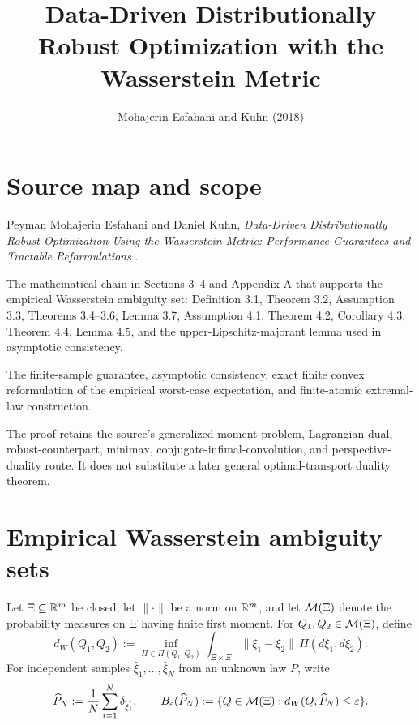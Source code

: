 
\title{Data-Driven Distributionally Robust Optimization with the Wasserstein Metric}
\author{}
\date{Mohajerin Esfahani and Kuhn (2018)}

\maketitle

\section*{Source map and scope}
\begin{sourceguide}
\item[Primary source] Peyman Mohajerin Esfahani and Daniel Kuhn, \emph{Data-Driven Distributionally Robust Optimization Using the Wasserstein Metric: Performance Guarantees and Tractable Reformulations} \cite{MohajerinEsfahaniKuhn2018}.
\item[Coverage] The mathematical chain in Sections 3--4 and Appendix A that supports the empirical Wasserstein ambiguity set: Definition 3.1, Theorem 3.2, Assumption 3.3, Theorems 3.4--3.6, Lemma 3.7, Assumption 4.1, Theorem 4.2, Corollary 4.3, Theorem 4.4, Lemma 4.5, and the upper-Lipschitz-majorant lemma used in asymptotic consistency.
\item[Target results] The finite-sample guarantee, asymptotic consistency, exact finite convex reformulation of the empirical worst-case expectation, and finite-atomic extremal-law construction.
\item[Method] The proof retains the source's generalized moment problem, Lagrangian dual, robust-counterpart, minimax, conjugate-infimal-convolution, and perspective-duality route.  It does not substitute a later general optimal-transport duality theorem.
\end{sourceguide}

\section{Empirical Wasserstein ambiguity sets}
Let $\Xi\subseteq\mathbb{R}^m$ be closed, let $\|\cdot\|$ be a norm on $\mathbb{R}^m$, and let $\mathcal{M}(\Xi)$ denote the probability measures on $\Xi$ having finite first moment.  For $Q_1,Q_2\in\mathcal{M}(\Xi)$, define
\begin{equation}\label{eq:MEK-W1}
 d_W(Q_1,Q_2)
 :=\inf_{\Pi\in\Pi(Q_1,Q_2)}
   \int_{\Xi\times\Xi}\|\xi_1-\xi_2\|\,\Pi(d\xi_1,d\xi_2).
\end{equation}
For independent samples $\widehat\xi_1,\dots,\widehat\xi_N$ from an unknown law $P$, write
\[
 \widehat P_N:=\frac1N\sum_{i=1}^N\delta_{\widehat\xi_i},
 \qquad
 B_\varepsilon(\widehat P_N)
 :=\{Q\in\mathcal{M}(\Xi):d_W(Q,\widehat P_N)\le\varepsilon\}.
\]

